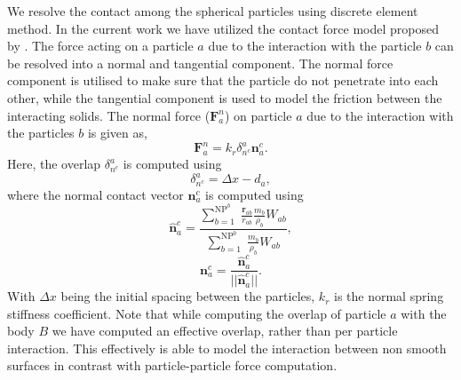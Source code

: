 \documentclass[preprint,12pt]{elsarticle}
\newcommand{\teng}[1]{\ensuremath{\boldsymbol{#1}}}
\newcommand{\ten}[1]{\ensuremath{\mathbf{#1}}}
\begin{document}
We resolve the contact among the spherical particles using discrete element
method. In the current work we have utilized the contact force model proposed
by \citet{mohseni2021particle}. The force acting on a particle $a$ due to the
interaction with the particle $b$ can be resolved into a normal and tangential
component. The normal force component is utilised to make sure that the
particle do not penetrate into each other, while the tangential component is
used to model the friction between the interacting solids.  The normal force
($\teng{F}_a^{n}$) on particle $a$ due to the interaction with the particles
$b$ is given as,
\begin{equation}
  \label{eq:contact-algorithm-normal}
  \ten{F}_a^n = k_r \delta_{n^{c}}^{a} \ten{n}_a^{c}.
\end{equation}
Here, the overlap $\delta_{n^{c}}^{a}$ is computed using
\begin{equation}
  \label{eq:cf-overlap}
  \delta_{n^{c}}^{a} = \Delta x - d_a,
\end{equation}
where the normal contact vector $\ten{n}_a^{c}$ is computed using
\begin{equation}
  \label{eq:cf-normal-vector}
  \ten{\hat{n}}_a^{c} = \frac{
    \displaystyle\sum\limits_{b = 1}^{\text{NP}^{b}} \;
    \frac{\ten{r}_{ab}}{r_{ab}}  \frac{m_b}{\rho_b} W_{ab}}
  {
    \displaystyle\sum\limits_{b = 1}^{\text{NP}^{b}} \;
    \frac{m_b}{\rho_b} W_{ab}},
\end{equation}
\begin{equation}
  \label{eq:cf-normal-vector}
  \ten{n}_a^{c} = \frac{\teng{\hat{n}}_a^{c}}{||\teng{\hat{n}}_a^{c}||}.
\end{equation}
With $\Delta x$ being the initial spacing between the particles, $k_r$ is the normal
spring stiffness coefficient. Note that while computing the overlap of
particle $a$ with the body $B$ we have computed an effective overlap, rather
than per particle interaction. This effectively is able to model the
interaction between non smooth surfaces in contrast with particle-particle
force computation.
\end{document}
